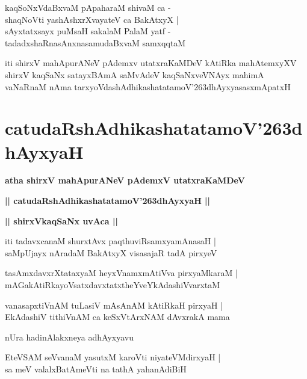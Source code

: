 \documentclass[twoside,12pt,openright]{book}
\def\S{\char'263}
\newcounter{shloka}[chapter]
\def\uvaca#1{\centerline{{\large\textbf{#1}}}}
\begin{document}
\begin{shloka}%
kaqSoNxVdaBxvaM pApaharaM shivaM ca -\\
shaqNoVti yashAshxrXvayateV ca BakAtxyX |\\
sAyxtatxsayx puMsaH sakalaM PalaM yatf - \\
tadadxshaRnasAnxnasamudaBxvaM samxqqtaM 
\end{shloka}

\begin{center}
iti shirxV mahApurANeV pAdemxv utatxraKaMDeV kAtiRka mahAtemxyXV shirxV kaqSaNx satayxBAmA 
saMvAdeV kaqSaNxveVNAyx mahimA vaNaRnaM nAma tarxyoVdashAdhikashatatamoV\S dhAyxyasasxmApatxH 
\end{center}

\chapter{catudaRshAdhikashatatamoV\S dhAyxyaH}

\begin{center}
{\LARGE\bfseries atha shirxV mahApurANeV pAdemxV utatxraKaMDeV}
\end{center}

\begin{center}
{\LARGE\bfseries || catudaRshAdhikashatatamoV\S dhAyxyaH || }
\end{center}

\uvaca{|| shirxVkaqSaNx uvAca ||}

\begin{shloka}%
iti tadavxcanaM shurxtAvx paqthuviRsamxyamAnasaH |\\
saMpUjayx nAradaM BakAtxyX visasajaR tadA pirxyeV 
\end{shloka}

\begin{shloka}%
tasAmxdavxrXtataxyaM heyxVnamxmAtiVva pirxyaMkaraM |\\
mAGakAtiRkayoVsatxdavxtatxtheYveYkAdashiVvarxtaM 
\end{shloka}

\begin{shloka}%
vanasapxtiVnAM tuLasiV mAsAnAM kAtiRkaH pirxyaH |\\
EkAdashiV tithiVnAM ca keSxVtArxNAM dAvxrakA mama 
\end{shloka}

\begin{center}
nUra hadinAlakxneya adhAyxyavu
\end{center}

\begin{shloka}%
EteVSAM seVvanaM yasutxM karoVti niyateVMdirxyaH |\\
sa meV valalxBatAmeVti na tathA yahanAdiBiH 
\end{shloka}
\end{document}
